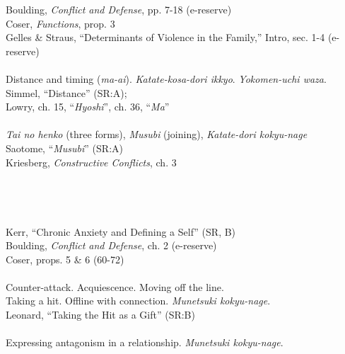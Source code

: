 \indent Boulding, \emph{Conflict and Defense}, pp. 7-18 (e-reserve) \\
\indent Coser, \emph{Functions}, prop. 3 \\
\indent Gelles \& Straus, ``Determinants of Violence in the Family,'' Intro, sec. 1-4 (e-reserve) \\
 \\
\indent Distance and timing (\emph{ma-ai}). \emph{Katate-kosa-dori ikkyo}. \emph{Yokomen-uchi waza}. \\
\indent Simmel, ``Distance'' (SR:A);  \\
\indent Lowry, ch. 15, ``\emph{Hyoshi}'', ch. 36, ``\emph{Ma}'' \\
 \\
\indent \emph{Tai no henko} (three forms), \emph{Musubi} (joining), \emph{Katate-dori kokyu-nage} \\
\indent Saotome, ``\emph{Musubi}'' (SR:A) \\
\indent Kriesberg, \emph{Constructive Conflicts}, ch. 3 \\
 \\
 \\
 \\
 \\
\indent Kerr, ``Chronic Anxiety and Defining a Self'' (SR, B)  \\
\indent Boulding, \emph{Conflict and Defense}, ch. 2 (e-reserve) \\
\indent Coser, props. 5 \& 6 (60-72) \\
 \\
\indent Counter-attack. Acquiescence. Moving off the line. \\
\indent Taking a hit. Offline with connection. \emph{Munetsuki kokyu-nage}. \\
\indent Leonard, ``Taking the Hit as a Gift'' (SR:B) \\
 \\
\indent Expressing antagonism in a relationship. \emph{Munetsuki kokyu-nage}. \\
 \\
 \\
 \\
